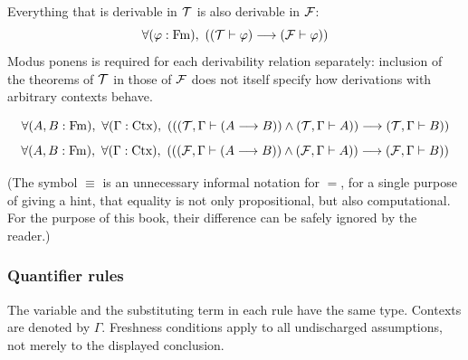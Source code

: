 Everything that is derivable in $\mathcal{T}$ is also derivable in ${\mathcal{F}}$:
\[
\forall (\varphi:\mathrm{Fm}),\ ((\mathcal{T} \vdash \varphi) \longrightarrow ({\mathcal{F}} \vdash \varphi))
\]
Modus ponens is required for each derivability relation separately: inclusion
of the theorems of $\mathcal{T}$ in those of ${\mathcal{F}}$ does not itself specify how
derivations with arbitrary contexts behave.

\[
\forall (A,B : \Fm),\ %
\forall (\Gamma : \Ctx),\ %
(
(
(\Tau,\Gamma \vdash (A \implies B))
\land 
(\Tau,\Gamma \vdash A )
)
\implies
(\Tau,\Gamma \vdash B)
)
\]
\[
\forall (A,B : \Fm),\ %
\forall (\Gamma : \Ctx),\ %
(
(
(\Fau,\Gamma \vdash (A \implies B))
\land 
(\Fau,\Gamma \vdash A)
)
\implies
(\Fau,\Gamma \vdash B)
)
\]

(The symbol $\equiv$ is an unnecessary informal notation for $=$, for a single purpose of giving a hint, that equality is not only propositional, but also computational. For the purpose of this book, their difference can be safely ignored by the reader.)

\subsubsection{Quantifier rules}
The variable and the substituting term in each rule have the same type.
Contexts are denoted by $\Gamma$. Freshness conditions apply to all undischarged
assumptions, not merely to the displayed conclusion.


%

